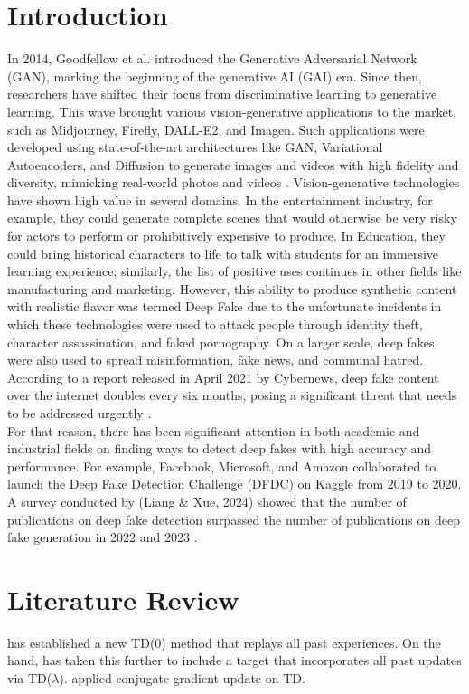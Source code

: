 \documentclass{svproc}
\begin{document}
\section{Introduction}
    In 2014, Goodfellow et al. introduced the Generative Adversarial Network (GAN), marking the beginning of the generative AI (GAI) era. Since then, researchers have shifted their focus from discriminative learning to generative learning. This wave brought various vision-generative applications to the market, such as Midjourney, Firefly, DALL-E2, and Imagen\cite {bengesi2024advancements}. Such applications were developed using state-of-the-art architectures like GAN, Variational Autoencoders, and Diffusion to generate images and videos with high fidelity and diversity, mimicking real-world photos and videos \cite{raut2024generative}. 
Vision-generative technologies have shown high value in several domains. In the entertainment industry, for example, they could generate complete scenes that would otherwise be very risky for actors to perform or prohibitively expensive to produce. In Education, they could bring historical characters to life to talk with students for an immersive learning experience; similarly, the list of positive uses continues in other fields like manufacturing and marketing. However, this ability to produce synthetic content with realistic flavor was termed Deep Fake due to the unfortunate incidents in which these technologies were used to attack people through identity theft, character assassination, and faked pornography. On a larger scale, deep fakes were also used to spread misinformation, fake news, and communal hatred.
According to a report released in April 2021 by Cybernews, deep fake content over the internet doubles every six months, posing a significant threat that needs to be addressed urgently \cite{patel2023deepfake}. 
\\For that reason, there has been significant attention in both academic and industrial fields on finding ways to detect deep fakes with high accuracy and performance. For example, Facebook, Microsoft, and Amazon collaborated to launch the Deep Fake Detection Challenge (DFDC) on Kaggle from 2019 to 2020. A survey conducted by (Liang \& Xue, 2024) showed that the number of publications on deep fake detection surpassed the number of publications on deep fake generation in 2022 and 2023 \cite {gong2024contemporary}.

\section{Literature Review}
    \cite{TD0-Replay} has established a new TD(0) method that replays all past experiences. On the hand, \cite{TD-Replay} has taken this further to include a target that incorporates all past updates via TD($\lambda$). \cite{ConjugateTD} applied conjugate gradient update on TD.
\end{document}
